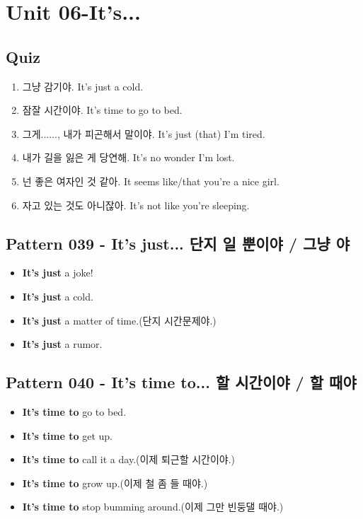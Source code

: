 \documentclass[11pt]{oblivoir}
\begin{document}
\section{Unit 06-It's...}
\subsection{Quiz}
\begin{enumerate}
  \color{black} \item 그냥 감기야. 
    \color{light-gray} It's just a cold.
  \color{black} \item 잠잘 시간이야.
    \color{light-gray} It's time to go to bed.
  \color{red} \item 그게......, 내가 피곤해서 말이야.
    \color{light-gray} It's just (that) I'm tired.
  \color{red} \item 내가 길을 잃은 게 당연해.
    \color{light-gray} It's no wonder I'm lost.
  \color{red} \item 넌 좋은 여자인 것 같아.
    \color{light-gray} It seems like/that you're a nice girl.
  \color{red} \item 자고 있는 것도 아니잖아.
    \color{light-gray} It's not like you're sleeping.
\end{enumerate}

\subsection{Pattern 039 - It's just... 단지 \texttildelow 일 뿐이야 / 그냥 \texttildelow 야}
\begin{itemize}
  \item \textbf{It's just} a joke!
  \item \textbf{It's just} a cold.
  \item \textbf{It's just} a matter of time.(단지 시간문제야.)
  \item \textbf{It's just} a rumor.
\end{itemize}

\subsection{Pattern 040 - It's time to... \texttildelow 할 시간이야 / \texttildelow 할 때야}
\begin{itemize}
  \item \textbf{It's time to} go to bed.
  \item \textbf{It's time to} get up.
  \item \textbf{It's time to} call it a day.(이제 퇴근할 시간이야.)
  \item \textbf{It's time to} grow up.(이제 철 좀 들 때야.)
  \item \textbf{It's time to} stop bumming around.(이제 그만 빈둥댈 때야.)
\end{itemize}
\end{document}
